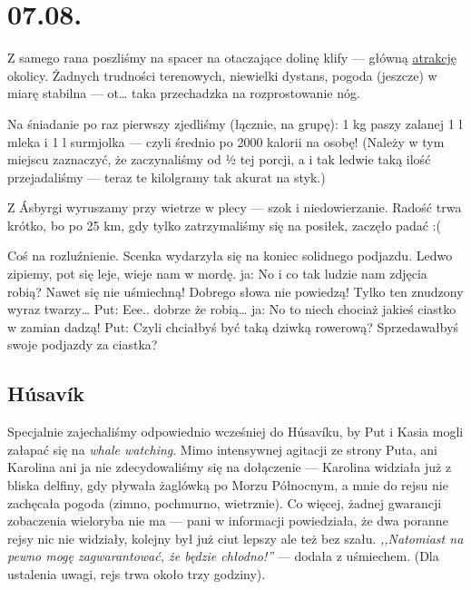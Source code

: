 \chapter*{07.08.}

Z samego rana poszliśmy na spacer na otaczające dolinę klify --- główną \href{http://www.visithusavik.com/attractions/asbyrgi-canyon/}{atrakcję} okolicy. Żadnych trudności terenowych, niewielki dystans, pogoda (jeszcze) w miarę stabilna --- ot… taka przechadzka na rozprostowanie nóg.

Na śniadanie po raz pierwszy zjedliśmy (łącznie, na grupę): 1 kg paszy zalanej 1 l mleka i 1 l surmjolka --- czyli średnio po 2000 kalorii na osobę! (Należy w tym miejscu zaznaczyć, że zaczynaliśmy od ½ tej porcji, a i tak ledwie taką ilość przejadaliśmy --- teraz te kilolgramy tak akurat na styk.)


Z Ásbyrgi wyruszamy przy wietrze w plecy --- szok i niedowierzanie. Radość trwa krótko, bo po 25 km, gdy tylko zatrzymaliśmy się na posiłek, zaczęło padać :(

Coś na rozluźnienie. Scenka wydarzyła się na koniec solidnego podjazdu. Ledwo zipiemy, pot się leje, wieje nam w mordę.
ja: No i co tak ludzie nam zdjęcia robią? Nawet się nie uśmiechną! Dobrego słowa nie powiedzą! Tylko ten znudzony wyraz twarzy…
Put: Eee.. dobrze że robią…
ja: No to niech chociaż jakieś ciastko w zamian dadzą!
Put: Czyli chciałbyś być taką dziwką rowerową? Sprzedawałbyś swoje podjazdy za ciastka?

\section*{Húsavík}

Specjalnie zajechaliśmy odpowiednio wcześniej do Húsavíku, by Put i Kasia mogli załapać się na \emph{whale watching}. Mimo intensywnej agitacji ze strony Puta, ani Karolina ani ja nie zdecydowaliśmy się na dołączenie --- Karolina widziała już z bliska delfiny, gdy pływała żaglówką po Morzu Północnym, a mnie do rejsu nie zachęcała pogoda (zimno, pochmurno, wietrznie). Co więcej, żadnej gwarancji zobaczenia wieloryba nie ma --- pani w informacji powiedziała, że dwa poranne rejsy nic nie widziały, kolejny był już ciut lepszy ale też bez szału. \emph{,,Natomiast na pewno mogę zagwarantować, że będzie chłodno!''} --- dodała z uśmiechem. (Dla ustalenia uwagi, rejs trwa około trzy godziny).

